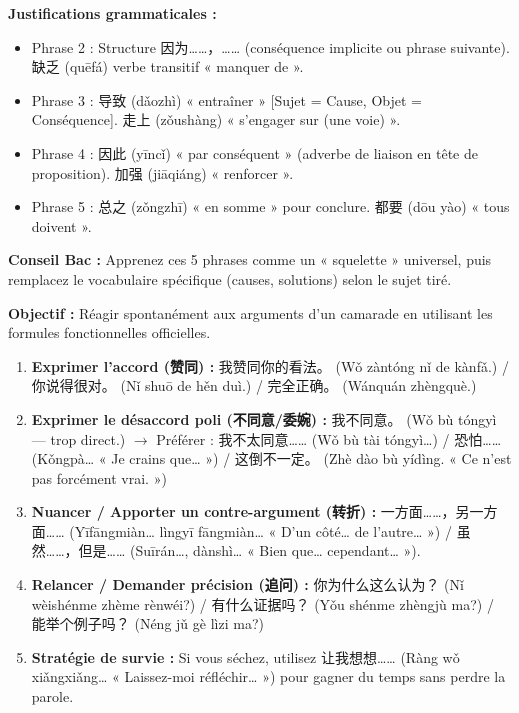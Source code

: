 \documentclass[11pt]{article}
\newcommand{\cle}[1]{{\popxbold\color{popdark}#1}}
\begin{document}
\begin{exoresolu}
\textbf{Justifications grammaticales :}
\begin{itemize}
    \item Phrase 2 : Structure \cle{因为……，……} (conséquence implicite ou phrase suivante). \cle{缺乏} (quēfá) verbe transitif « manquer de ».
    \item Phrase 3 : \cle{导致} (dǎozhì) « entraîner » [Sujet = Cause, Objet = Conséquence]. \cle{走上} (zǒushàng) « s'engager sur (une voie) ».
    \item Phrase 4 : \cle{因此} (yīncǐ) « par conséquent » (adverbe de liaison en tête de proposition). \cle{加强} (jiāqiáng) « renforcer ».
    \item Phrase 5 : \cle{总之} (zǒngzhī) « en somme » pour conclure. \cle{都要} (dōu yào) « tous doivent ».
\end{itemize}
\textbf{Conseil Bac :} Apprenez ces 5 phrases comme un « squelette » universel, puis remplacez le vocabulaire spécifique (causes, solutions) selon le sujet tiré.
\end{exoresolu}

\begin{methode}
\textbf{Objectif :} Réagir spontanément aux arguments d'un camarade en utilisant les formules fonctionnelles officielles.
\begin{enumerate}
    \item \textbf{Exprimer l'accord (赞同) :} \cle{我赞同你的看法。} (Wǒ zàntóng nǐ de kànfǎ.) / \cle{你说得很对。} (Nǐ shuō de hěn duì.) / \cle{完全正确。} (Wánquán zhèngquè.)
    \item \textbf{Exprimer le désaccord poli (不同意/委婉) :} \cle{我不同意。} (Wǒ bù tóngyì — trop direct.) $\rightarrow$ Préférer : \cle{我不太同意……} (Wǒ bù tài tóngyì…) / \cle{恐怕……} (Kǒngpà… « Je crains que… ») / \cle{这倒不一定。} (Zhè dào bù yídìng. « Ce n'est pas forcément vrai. »)
    \item \textbf{Nuancer / Apporter un contre-argument (转折) :} \cle{一方面……，另一方面……} (Yīfāngmiàn… lìngyī fāngmiàn… « D'un côté… de l'autre… ») / \cle{虽然……，但是……} (Suīrán…, dànshì… « Bien que… cependant… »).
    \item \textbf{Relancer / Demander précision (追问) :} \cle{你为什么这么认为？} (Nǐ wèishénme zhème rènwéi?) / \cle{有什么证据吗？} (Yǒu shénme zhèngjù ma?) / \cle{能举个例子吗？} (Néng jǔ gè lìzi ma?)
    \item \textbf{Stratégie de survie :} Si vous séchez, utilisez \cle{让我想想……} (Ràng wǒ xiǎngxiǎng… « Laissez-moi réfléchir… ») pour gagner du temps sans perdre la parole.
\end{enumerate}
\end{methode}
\end{document}
